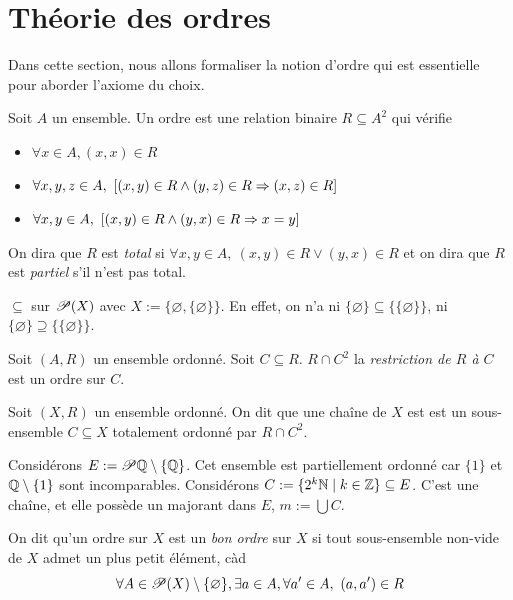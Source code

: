 \section{Théorie des ordres}
Dans cette section, nous allons formaliser la notion d'ordre qui est essentielle pour aborder l'axiome du choix.
\begin{definition}
    Soit $A$ un ensemble. Un ordre est une relation binaire $R\subseteq A^2$ qui vérifie \begin{itemize}
        \item $\forall x \in A, (x,x)\in R$
        \item $\forall x,y,z\in A,\ [(x,y)\in R\land (y,z)\in R\Rightarrow(x,z)\in R]$
        \item $\forall x,y\in A,\ [(x,y)\in R\land (y,x)\in R\Rightarrow x=y] $
    \end{itemize}
    On dira que $R$ est \emph{total} si $\forall x, y \in A,\ (x,y)\in R \lor (y,x)\in R$ et on dira que $R$ est \emph{partiel} s'il n'est pas total.
\end{definition}
\begin{exemple}
    $\subseteq$ sur $\mathscr{P}(X)$ avec $X:= \{\varnothing,\{\varnothing\}\}$. En effet, on n'a ni $\{\varnothing\}\subseteq\{\{\varnothing\}\}$, ni $\{\varnothing\}\supseteq\{\{\varnothing\}\}$.
\end{exemple}
\begin{proposition}
    Soit $(A,R)$ un ensemble ordonné. Soit $C\subseteq R$. $R\cap C^2$ la \emph{restriction de $R$ à $C$} est un ordre sur $C$.
\end{proposition}
\begin{definition}[Chaîne]
    Soit $(X,R)$ un ensemble ordonné. On dit que une chaîne de $X$ est est un sous-ensemble $C\subseteq X$ totalement ordonné par $R\cap C^2$.
\end{definition}
\begin{exemple}
    Considérons $E:=\mathscr{P}\mathbb{Q}\setminus \{\mathbb{Q}\}$. Cet ensemble est partiellement ordonné car $\{1\}$ et $\mathbb{Q}\setminus \{1\}$ sont incomparables. Considérons $C:=\{2^k\mathbb{N}\mid k\in\mathbb{Z}\}\subseteq E$. C'est une chaîne, et elle possède un majorant dans $E$, $m:=\bigcup C$.
\end{exemple}

\begin{definition}
    On dit qu'un ordre sur $X$ est un \emph{bon ordre} sur $X$ si tout sous-ensemble non-vide de $X$ admet un plus petit élément, càd $$\forall A\in\partie(X)\setminus\{\varnothing\},\exists a \in A,\forall a'\in A,\ (a,a')\in R$$
\end{definition}


